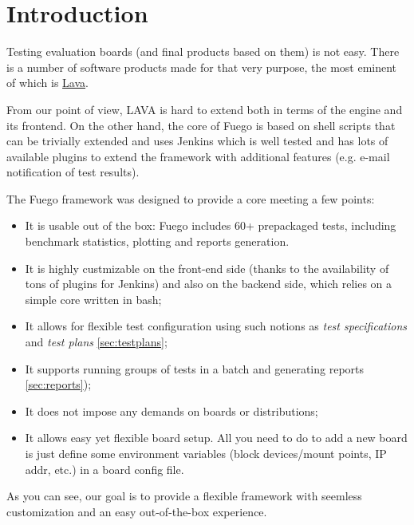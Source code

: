 \section{Introduction}
\label{sec:intro}

Testing evaluation boards (and final products based on them) is not easy. There is a number of software products made for that very purpose, the most eminent of which is \href{https://wiki.linaro.org/Platform/LAVA}{Lava}.

From our point of view, LAVA is hard to extend both in terms of the engine and its frontend. On the other hand, the core of Fuego is based on shell scripts that can be trivially extended and uses Jenkins which is well tested and has lots of available plugins to extend the framework with additional features (e.g. e-mail notification of test results).

The Fuego framework was designed to provide a core meeting a few points:

\begin{itemize}
\item It is usable out of the box: Fuego includes 60+ prepackaged tests, including benchmark statistics, plotting and reports generation.
\item It is highly custmizable on the front-end side (thanks to the availability of tons of plugins for Jenkins) and also on the backend side, which relies on a simple core written in bash;
\item It allows for flexible test configuration using such notions as \textit{test specifications} and \textit{test plans} \ref{sec:testplans};
\item It supports running groups of tests in a batch and generating reports \ref{sec:reports});
\item It does not impose any demands on boards or distributions;
\item It allows easy yet flexible board setup. All you need to do to add a new board is just define some environment variables (block devices/mount points, IP addr, etc.) in a board config file.
\end{itemize}

As you can see, our goal is to provide a flexible framework with seemless customization and an easy out-of-the-box experience.


